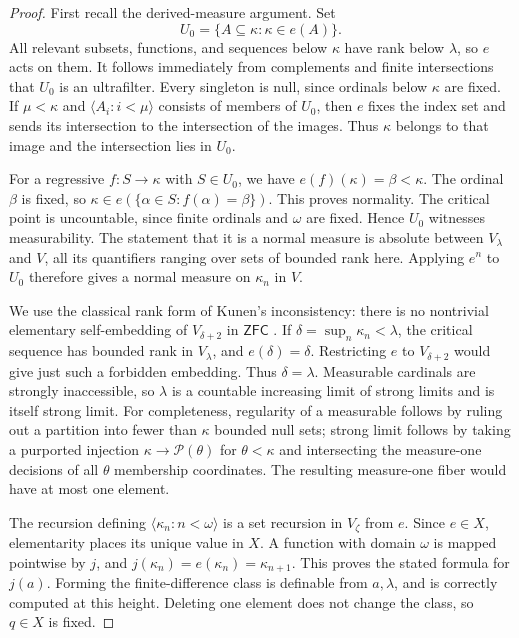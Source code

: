 \documentclass[11pt,letterpaper]{article}
\theoremstyle{definition}
\numberwithin{equation}{section}
\newcommand{\ZFC}{\mathsf{ZFC}}
\newcommand{\Pow}{\mathcal P}
\newcommand{\seq}[1]{\langle #1\rangle}
\begin{document}
\begin{proof}
First recall the derived-measure argument. Set
\[
 U_0=\{A\subseteq\kappa:\kappa\in e(A)\}.
\]
All relevant subsets, functions, and sequences below $\kappa$ have
rank below $\lambda$, so $e$ acts on them. It follows immediately from
complements and finite intersections that $U_0$ is an ultrafilter.
Every singleton is null, since ordinals below $\kappa$ are fixed. If
$\mu<\kappa$ and $\seq{A_i:i<\mu}$ consists of members of $U_0$, then
$e$ fixes the index set and sends its intersection to the intersection
of the images. Thus $\kappa$ belongs to that image and the intersection
lies in $U_0$.

For a regressive $f:S\to\kappa$ with $S\in U_0$, we have
$e(f)(\kappa)=\beta<\kappa$. The ordinal $\beta$ is fixed, so
$\kappa\in e(\{\alpha\in S:f(\alpha)=\beta\})$. This proves normality.
The critical point is uncountable, since finite ordinals and $\omega$
are fixed. Hence $U_0$ witnesses measurability. The statement that it is
a normal measure is absolute between $V_\lambda$ and $V$, all its
quantifiers ranging over sets of bounded rank here. Applying $e^n$ to
$U_0$ therefore gives a normal measure on $\kappa_n$ in $V$.

We use the classical rank form of Kunen's inconsistency: there is no
nontrivial elementary self-embedding of $V_{\delta+2}$ in $\ZFC$
\cite{kunen}. If $\delta=\sup_n\kappa_n<\lambda$, the critical sequence
has bounded rank in $V_\lambda$, and $e(\delta)=\delta$. Restricting
$e$ to $V_{\delta+2}$ would give just such a forbidden embedding. Thus
$\delta=\lambda$. Measurable cardinals are strongly inaccessible, so
$\lambda$ is a countable increasing limit of strong limits and is itself
strong limit. For completeness, regularity of a measurable follows by
ruling out a partition into fewer than $\kappa$ bounded null sets;
strong limit follows by taking a purported injection
$\kappa\to\Pow(\theta)$ for $\theta<\kappa$ and intersecting the
measure-one decisions of all $\theta$ membership coordinates. The
resulting measure-one fiber would have at most one element.

The recursion defining $\seq{\kappa_n:n<\omega}$ is a set recursion in
$V_\zeta$ from $e$. Since $e\in X$, elementarity places its unique
value in $X$. A function with domain $\omega$ is mapped pointwise by
$j$, and $j(\kappa_n)=e(\kappa_n)=\kappa_{n+1}$. This proves the stated
formula for $j(a)$. Forming the finite-difference class is definable
from $a,\lambda$, and is correctly computed at this height. Deleting
one element does not change the class, so $q\in X$ is fixed.
\end{proof}
\end{document}
